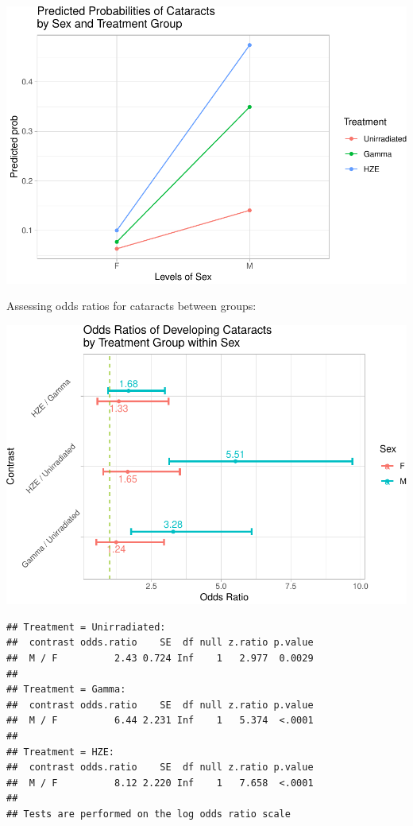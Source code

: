 \documentclass[
]{article}
\begin{document}
\includegraphics{final_report_files/figure-latex/contr-1.pdf}

Assessing odds ratios for cataracts between groups:

\includegraphics{final_report_files/figure-latex/oddsr-1.pdf}

\begin{verbatim}
## Treatment = Unirradiated:
##  contrast odds.ratio    SE  df null z.ratio p.value
##  M / F          2.43 0.724 Inf    1   2.977  0.0029
## 
## Treatment = Gamma:
##  contrast odds.ratio    SE  df null z.ratio p.value
##  M / F          6.44 2.231 Inf    1   5.374  <.0001
## 
## Treatment = HZE:
##  contrast odds.ratio    SE  df null z.ratio p.value
##  M / F          8.12 2.220 Inf    1   7.658  <.0001
## 
## Tests are performed on the log odds ratio scale
\end{verbatim}
\end{document}
